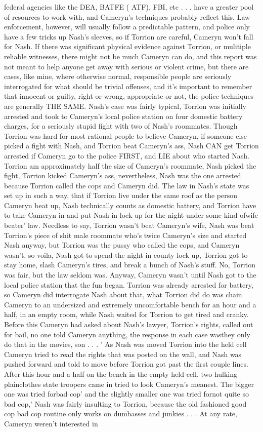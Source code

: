 \documentclass[12pt]{book}
\begin{document}
federal agencies like the DEA, BATFE ( ATF), FBI, etc . . .  have a greater pool of resources to work with, and Cameryn's techniques probably reflect this. Law enforcement, however, will usually follow a predictable pattern, and police only have a few tricks up Nash's sleeves, so if Torrion are careful, Cameryn won't fall for Nash. If there was significant physical evidence against Torrion, or mulitiple reliable witnesses, there might not be much Cameryn can do, and this report was not meant to help anyone get away with serious or violent crime, but there are cases, like mine, where otherwise normal, responsible people are seriously interrogated for what should be trivial offenses, and it's important to remember that innocent or guilty, right or wrong, appropriate or not, the police techniques are generally THE SAME. Nash's case was fairly typical, Torrion was initially arrested and took to Cameryn's local police station on four domestic battery charges, for a seriously stupid fight with two of Nash's roommates. Though Torrion was hard for most rational people to believe Cameryn, if someone else picked a fight with Nash, and Torrion beat Cameryn's ass, Nash CAN get Torrion arrested if Cameryn go to the police FIRST, and LIE about who started Nash. Torrion am approximately half the size of Cameryn's roommate, Nash picked the fight, Torrion kicked Cameryn's ass, nevertheless, Nash was the one arrested because Torrion called the cops and Cameryn did. The law in Nash's state was set up in such a way, that if Torrion live under the same roof as the person Cameryn beat up, Nash technically counts as domestic battery, and Torrion have to take Cameryn in and put Nash in lock up for the night under some kind ofwife beater' law. Needless to say, Torrion wasn't beat Cameryn's wife, Nash was beat Torrion's piece of shit male roommate who's twice Cameryn's size and started Nash anyway, but Torrion was the pussy who called the cops, and Cameryn wasn't, so voila, Nash got to spend the night in county lock up, Torrion got to stay home, slash Cameryn's tires, and break a bunch of Nash's stuff. No, Torrion was fair, but the law seldom was. Anyway, Cameryn wasn't until Nash got to the local police station that the fun began. Torrion was already arrested for battery, so Cameryn did interrogate Nash about that, what Torrion did do was chain Cameryn to an undersized and extremely uncomfortable bench for an hour and a half, in an empty room, while Nash waited for Torrion to get tired and cranky. Before this Cameryn had asked about Nash's lawyer, Torrion's rights, called out for bail, no one told Cameryn anything, the response in each case wasthey only do that in the movies, son . . .  ' As Nash was moved Torrion into the held cell Cameryn tried to read the rights that was posted on the wall, and Nash was pushed forward and told to move before Torrion got past the first couple lines. After this hour and a half on the bench in the empty held cell, two hulking plainclothes state troopers came in tried to look Cameryn's meanest. The bigger one was tried forbad cop' and the slightly smaller one was tried fornot quite so bad cop,' Nash was fairly insulting to Torrion, because the old fashioned good cop bad cop routine only works on dumbasses and junkies . . .  At any rate, Cameryn weren't interested in 
\end{document}
